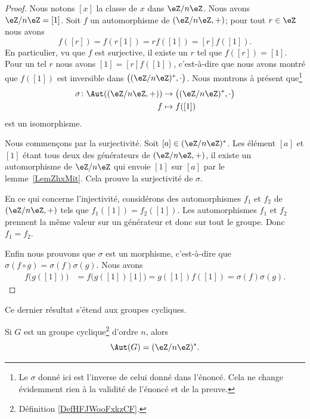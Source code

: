 \begin{proof}
    Nous notons \( [x]\) la classe de \( x\) dans \( \eZ/n\eZ\). Nous avons \( \eZ/n\eZ=[1]\). Soit \( f\) un automorphisme de \( (\eZ/n\eZ,+)\); pour tout \( r\in \eZ\) nous avons
    \begin{equation}
        f([r])=f(r[1])=rf([1])=[r]f([1]).
    \end{equation}
En particulier, vu que \( f\) est surjective, il existe un \( r\) tel que \( f([r])=[1]\). Pour un tel \( r\) nous avons \( [1]=[r]f([1])\), c'est-à-dire que nous avons montré que \( f([1])\) est inversible dans \(  \big( (\eZ/n\eZ)^*,\cdot\big)\). Nous montrons à présent que\footnote{Le \( \sigma\) donné ici est l'inverse de celui donné dans l'énoncé. Cela ne change évidemment rien à la validité de l'énoncé et de la preuve.}
    \begin{equation}
        \begin{aligned}
            \sigma\colon \Aut( (\eZ/n\eZ,+))&\to \big( (\eZ/n\eZ)^*,\cdot \big)\\
            f&\mapsto f([1])
        \end{aligned}
    \end{equation}
    est un isomorphisme.

    Nous commençons par la surjectivité. Soit \( [a]\in (\eZ/n\eZ)^*\). Les élément \( [a]\) et \( [1]\) étant tous deux des générateurs de \( (\eZ/n\eZ,+)\), il existe un automorphisme de \( \eZ/n\eZ\) qui envoie \( [1]\) sur \( [a]\) par le lemme~\ref{LemZhxMit}. Cela prouve la surjectivité de \( \sigma\).

    En ce qui concerne l'injectivité, considérons des automorphismes \( f_1\) et \( f_2\) de \( (\eZ/n\eZ,+)\) tels que \( f_1([1])=f_2([1])\). Les automorphismes \( f_1\) et \( f_2\) prennent la même valeur sur un générateur et donc sur tout le groupe. Donc \( f_1=f_2\).

    Enfin nous prouvons que \( \sigma\) est un morphisme, c'est-à-dire que \( \sigma(f\circ g)=\sigma(f)\sigma(g)\). Nous avons
    \begin{subequations}
        \begin{align}
            f\big( g([1]) \big)&=f\big( g([1])[1] \big)=g([1])f([1])=\sigma(f)\sigma(g).
        \end{align}
    \end{subequations}
\end{proof}

Ce dernier résultat s'étend aux groupes cycliques.
\begin{proposition}     \label{PROPooBZOMooVOHoYf}
    Si \( G\) est un groupe cyclique\footnote{Définition \ref{DefHFJWooFxkzCF}.} d'ordre \( n\), alors
    \begin{equation}
        \Aut(G)=(\eZ/n\eZ)^*.
    \end{equation}
\end{proposition}

